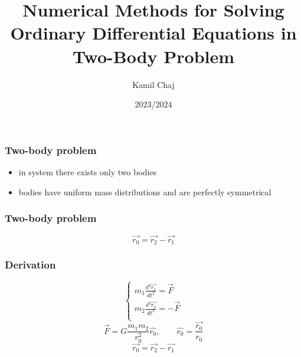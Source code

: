 \documentclass[english,12pt,a4paper]{beamer}
\title{Numerical Methods for Solving Ordinary Differential Equations in Two-Body Problem}
\author{Kamil Chaj}
\date{2023/2024}
\begin{document}
	\frame{\titlepage}
	\graphicspath{ {../latex/pictures/} }
	
	\begin{frame}
		\frametitle{Two-body problem}
		\begin{itemize}
			\item in system there exists only two bodies
			\item bodies have uniform mass distributions and are perfectly symmetrical
		\end{itemize}
	\end{frame}
	
	\begin{frame}
		\frametitle{Two-body problem}
			\centering
			$$
			\vec{r_0} = \vec{r_2} - \vec{r_1}
			$$
			
	\end{frame}
	\begin{frame}
		\frametitle{Derivation}
		\begin{equation}\label{gen_tb}
			\begin{cases}
				m_1 \frac{d^2\vec{r_1}}{dt^2} = \vec{F} \\
				m_2 \frac{d^2\vec{r_2}}{dt^2} = - \vec{F} \\
			\end{cases}
		\end{equation}
		\begin{equation}\label{uni_newton}
			\vec{F} = G \frac{m_1 m_2}{r_0^2}\hat{r_0}, \qquad \hat{r_0} = \frac{\vec{r_0}}{r_0}
		\end{equation}
		\begin{equation}\label{vec}
			\vec{r_0} = \vec{r_2} - \vec{r_1}
		\end{equation}
	\end{frame}
\end{document}
